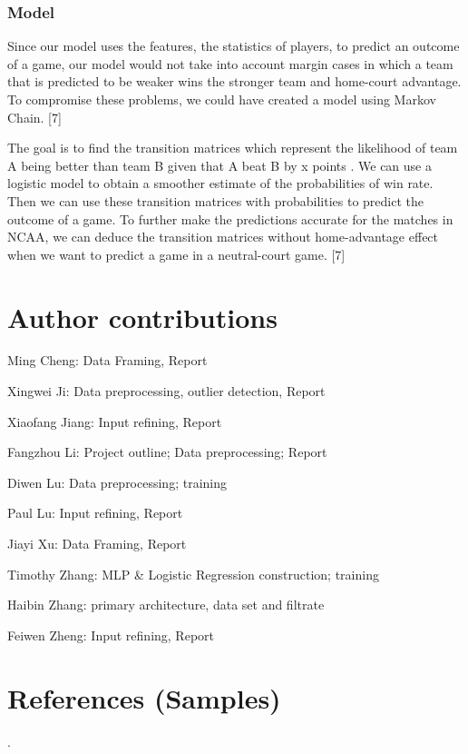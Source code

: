 \documentclass[12pt]{article}
\begin{document}
\subsubsection{Model}

\quad Since our model uses the features, the statistics of players, to predict an outcome of a game, our model would not take into account margin cases in which a team that is predicted to be weaker wins the stronger team and home-court advantage. To compromise these problems, we could have created a model using Markov Chain. [7]

\quad The goal is to find the transition matrices which represent the likelihood of team A being better than team B given that A beat B by x points . We can use a logistic model to obtain a smoother estimate of  the probabilities of  win rate. Then we can use these transition matrices with probabilities to predict the outcome of a game. To further make the predictions accurate for the matches in NCAA, we can deduce the transition matrices without home-advantage effect when we want to predict a game in a neutral-court game. [7]


\newpage

\section*{Author contributions}

Ming Cheng: Data Framing, Report

Xingwei Ji: Data preprocessing, outlier detection, Report

Xiaofang Jiang: Input refining, Report

Fangzhou Li: Project outline; Data preprocessing; Report

Diwen Lu: Data preprocessing; training

Paul Lu: Input refining, Report

Jiayi Xu: Data Framing, Report

Timothy Zhang: MLP \& Logistic Regression construction; training

Haibin Zhang: primary architecture, data set and filtrate

Feiwen Zheng: Input refining, Report \newpage



\section*{References (Samples)}
\qquad \qquad \qquad \qquad \qquad \qquad \qquad \qquad \qquad \qquad \qquad \qquad \qquad \qquad \qquad \qquad \qquad \qquad \qquad \qquad \qquad \qquad \qquad \qquad \qquad \qquad .
 
\end{document}

